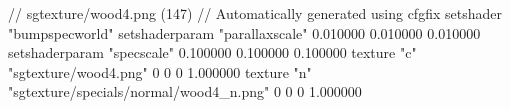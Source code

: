 // sgtexture/wood4.png (147)
// Automatically generated using cfgfix
setshader "bumpspecworld"
setshaderparam "parallaxscale" 0.010000 0.010000 0.010000
setshaderparam "specscale" 0.100000 0.100000 0.100000
texture "c" "sgtexture/wood4.png" 0 0 0 1.000000
texture "n" "sgtexture/specials/normal/wood4_n.png" 0 0 0 1.000000
